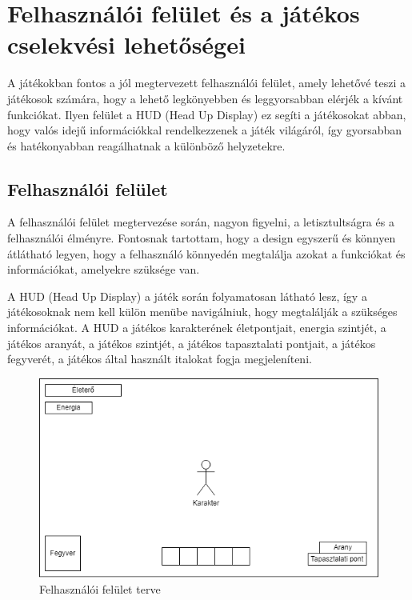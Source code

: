 \section{Felhasználói felület és a játékos cselekvési lehetőségei}

\indent \indent A játékokban fontos a jól megtervezett felhasználói felület, amely lehetővé teszi a játékosok számára, hogy a lehető legkönyebben és leggyorsabban elérjék a kívánt funkciókat. Ilyen felület a HUD (Head Up Display)  ez segíti a játékosokat abban, hogy valós idejű információkkal rendelkezzenek a játék világáról, így gyorsabban és hatékonyabban reagálhatnak a különböző helyzetekre.


\subsection{Felhasználói felület}

\indent \indent A felhasználói felület megtervezése során, nagyon figyelni, a letisztultságra és a felhasználói élményre. Fontosnak tartottam, hogy a design egyszerű és könnyen átlátható legyen, hogy a felhasználó könnyedén megtalálja azokat a funkciókat és információkat, amelyekre szüksége van.

A HUD (Head Up Display) a játék során folyamatosan látható lesz, így a játékosoknak nem kell külön menübe navigálniuk, hogy megtalálják a szükséges információkat. A HUD a játékos karakterének életpontjait, energia szintjét, a játékos aranyát, a játékos szintjét, a játékos tapasztalati pontjait, a játékos fegyverét, a játékos által használt italokat fogja megjeleníteni.

\begin{figure}[H]
    \centering
    \includegraphics[width=14.0truecm]{images/MS_UI.drawio.png}
    \caption{Felhasználói felület terve
    \cite{Felhasználói-felület-terve}}
    \label{fig:Felhasználói felület}
\end{figure}

